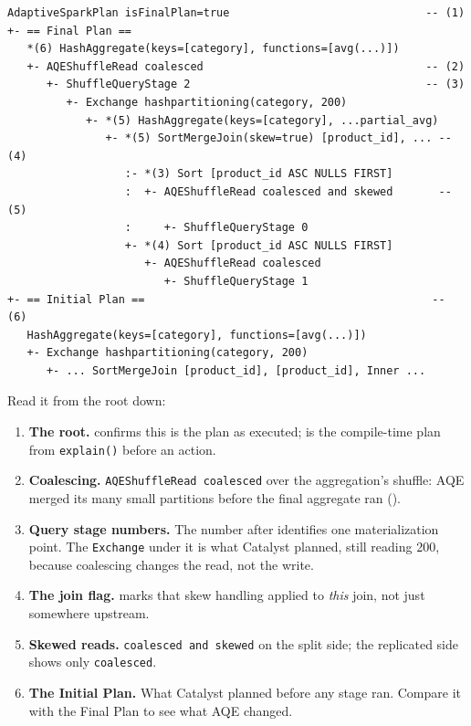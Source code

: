 \begin{lstlisting}[language=text,numbers=none,style=plan,caption={A final AQE plan, annotated (\texttt{EXPLAIN}, trimmed)},captionpos=b,label=lst:aqe-final-plan]
AdaptiveSparkPlan isFinalPlan=true                              -- (1)
+- == Final Plan ==
   *(6) HashAggregate(keys=[category], functions=[avg(...)])
   +- AQEShuffleRead coalesced                                  -- (2)
      +- ShuffleQueryStage 2                                    -- (3)
         +- Exchange hashpartitioning(category, 200)
            +- *(5) HashAggregate(keys=[category], ...partial_avg)
               +- *(5) SortMergeJoin(skew=true) [product_id], ... -- (4)
                  :- *(3) Sort [product_id ASC NULLS FIRST]
                  :  +- AQEShuffleRead coalesced and skewed       -- (5)
                  :     +- ShuffleQueryStage 0
                  +- *(4) Sort [product_id ASC NULLS FIRST]
                     +- AQEShuffleRead coalesced
                        +- ShuffleQueryStage 1
+- == Initial Plan ==                                            -- (6)
   HashAggregate(keys=[category], functions=[avg(...)])
   +- Exchange hashpartitioning(category, 200)
      +- ... SortMergeJoin [product_id], [product_id], Inner ...
\end{lstlisting}

Read it from the root down:

\begin{enumerate}
  \item \textbf{The root.}  confirms this is the plan as
        executed;  is the compile-time plan from
        \texttt{explain()} before an action.
  \item \textbf{Coalescing.} \texttt{AQEShuffleRead coalesced} over the
        aggregation's shuffle: AQE merged its many small partitions before the
        final aggregate ran ().
  \item \textbf{Query stage numbers.} The number after 
        identifies one materialization point. The \texttt{Exchange} under it is
        what Catalyst planned, still reading 200, because coalescing changes the
        read, not the write.
  \item \textbf{The join flag.}  marks that skew
        handling applied to \emph{this} join, not just somewhere upstream.
  \item \textbf{Skewed reads.} \texttt{coalesced and skewed} on the split side;
        the replicated side shows only \texttt{coalesced}.
  \item \textbf{The Initial Plan.} What Catalyst planned before any stage ran.
        Compare it with the Final Plan to see what AQE changed.
\end{enumerate}

